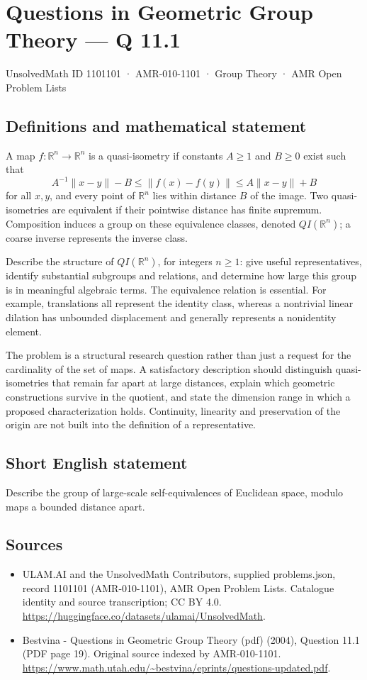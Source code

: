 \documentclass[11pt,a4paper]{article}
\begin{document}
\section*{Questions in Geometric Group Theory — Q 11.1}\label{1101101}
{\small UnsolvedMath ID 1101101 · AMR-010-1101 · Group Theory · AMR Open Problem Lists}
\subsection{Definitions and mathematical statement}
A map $f:\mathbb R^n\to\mathbb R^n$ is a quasi-isometry if constants $A\geq1$ and $B\geq0$ exist such that
\[
 A^{-1}\lVert x-y\rVert-B\leq\lVert f(x)-f(y)\rVert
       \leq A\lVert x-y\rVert+B
\]
for all $x,y$, and every point of $\mathbb R^n$ lies within distance $B$ of the image. Two quasi-isometries are equivalent if their pointwise distance has finite supremum. Composition induces a group on these equivalence classes, denoted $QI(\mathbb R^n)$; a coarse inverse represents the inverse class.

Describe the structure of $QI(\mathbb R^n)$, for integers $n\geq1$: give useful representatives, identify substantial subgroups and relations, and determine how large this group is in meaningful algebraic terms. The equivalence relation is essential. For example, translations all represent the identity class, whereas a nontrivial linear dilation has unbounded displacement and generally represents a nonidentity element.

The problem is a structural research question rather than just a request for the cardinality of the set of maps. A satisfactory description should distinguish quasi-isometries that remain far apart at large distances, explain which geometric constructions survive in the quotient, and state the dimension range in which a proposed characterization holds. Continuity, linearity and preservation of the origin are not built into the definition of a representative.
\subsection{Short English statement}
Describe the group of large-scale self-equivalences of Euclidean space, modulo maps a bounded distance apart.
\subsection{Sources}
\begin{itemize}
\item[S1] ULAM.AI and the UnsolvedMath Contributors, supplied problems.json, record 1101101 (AMR-010-1101), AMR Open Problem Lists. Catalogue identity and source transcription; CC BY 4.0.
\url{https://huggingface.co/datasets/ulamai/UnsolvedMath}.
\item[S2] Bestvina - Questions in Geometric Group Theory (pdf) (2004), Question 11.1 (PDF page 19). Original source indexed by AMR-010-1101.
\url{https://www.math.utah.edu/~bestvina/eprints/questions-updated.pdf}.
\end{itemize}
\end{document}
